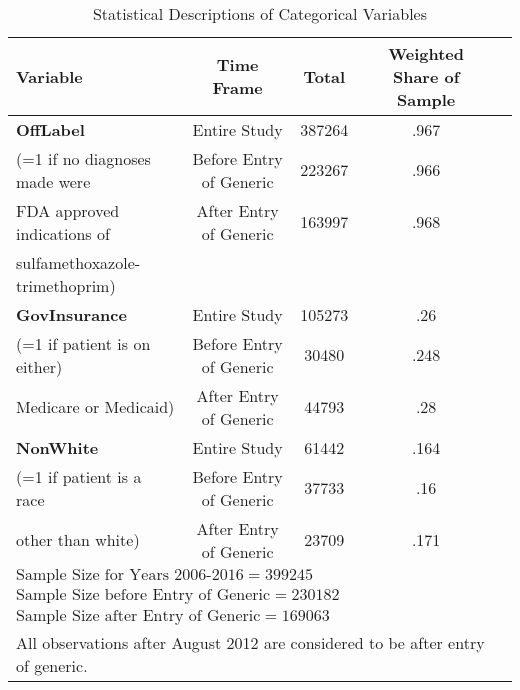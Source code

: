 \begin{table}[htbp]\
\def\sym#1{\ifmmode^{#1}\else\(^{#1}\)\fi}
\caption{Statistical Descriptions of Categorical Variables\label{tab1}}
{
\centering
\begin{tabular}{l*{4}{c}}
\hline\hline
            Variable&\multicolumn{1}{c}{Time Frame}&\multicolumn{1}{c}{Total}&\multicolumn{1}{c}{Weighted Share of Sample}\\
\hline
\textbf{OffLabel}                                                &     Entire Study&             387264&      .967\\
(=1 if no diagnoses made were          &     Before Entry of Generic&    223267&      .966\\
 FDA approved indications of  &     After Entry of Generic&      163997&      .968\\
sulfamethoxazole-trimethoprim)\\
[1em]
\textbf{GovInsurance}                                            &     Entire Study&             105273&      .26 \\
(=1 if patient is on either)       &     Before Entry of Generic&     30480 &      .248\\
Medicare or Medicaid)           &     After Entry of Generic&      44793 &      .28\\
[1em]
\textbf{NonWhite}                                                &     Entire Study&             61442&      .164\\
(=1 if patient is a race                &     Before Entry of Generic&     37733&      .16\\
other than white)                         &     After Entry of Generic&      23709&      .171\\
\hline
\multicolumn{4}{l}{$\text{Sample Size for Years 2006-2016} = 399245$}\\
\multicolumn{4}{l}{$\text{Sample Size before Entry of Generic} = 230182$}\\
\multicolumn{4}{l}{$\text{Sample Size after Entry of Generic} = 169063$}\\
\hline\hline
\multicolumn{4}{l}{\footnotesize All observations after August 2012 are considered to be after entry of generic.}\\
\end{tabular}
}
\label{tab:Table3.2}
\end{table}

